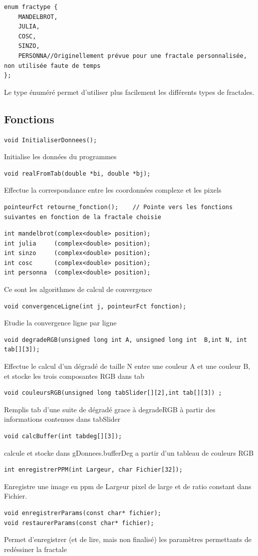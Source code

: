 \documentclass[a4paper,11pt]{article} \usepackage[T1]{fontenc} \usepackage[utf8]{inputenc} \usepackage[francais]{babel}
\begin{document}
\begin{lstlisting}
enum fractype {
    MANDELBROT,
    JULIA,
    COSC,
    SINZO,
    PERSONNA//Originellement prévue pour une fractale personnalisée, non utilisée faute de temps
};\end{lstlisting}
Le type énuméré permet d'utiliser plus facilement les différents types de fractales.


\subsection{Fonctions}
\begin{lstlisting}
void InitialiserDonnees(); \end{lstlisting}
Initialise les données du programmes
\begin{lstlisting}
void realFromTab(double *bi, double *bj);\end{lstlisting}
Effectue la correspondance entre les coordonnées complexe et les pixels
\begin{lstlisting}
pointeurFct retourne_fonction();    // Pointe vers les fonctions suivantes en fonction de la fractale choisie\end{lstlisting}
\begin{lstlisting}
int mandelbrot(complex<double> position);
int julia     (complex<double> position);
int sinzo     (complex<double> position);
int cosc      (complex<double> position);
int personna  (complex<double> position);\end{lstlisting}
Ce sont les algorithmes de calcul de convergence
\begin{lstlisting}
void convergenceLigne(int j, pointeurFct fonction);\end{lstlisting}
Etudie la convergence ligne par ligne
\begin{lstlisting}
void degradeRGB(unsigned long int A, unsigned long int  B,int N, int tab[][3]);\end{lstlisting}
Effectue le calcul d'un dégradé de taille N entre une couleur A et une couleur B, et stocke les trois composantes RGB dans tab
\begin{lstlisting}
void couleursRGB(unsigned long tabSlider[][2],int tab[][3]) ;\end{lstlisting}
Remplis tab d'une suite de dégradé grace à degradeRGB à partir des informations contenues dans tabSlider
\begin{lstlisting}
void calcBuffer(int tabdeg[][3]);\end{lstlisting}
calcule et stocke dans gDonnees.bufferDeg a partir d'un tableau de couleurs RGB
\begin{lstlisting}
int enregistrerPPM(int Largeur, char Fichier[32]);\end{lstlisting}
Enregistre une image en ppm de Largeur pixel de large et de ratio constant dans Fichier.
\begin{lstlisting}
void enregistrerParams(const char* fichier);
void restaurerParams(const char* fichier);\end{lstlisting}
Permet d'enregistrer (et de lire, mais non finalisé) les paramètres permettants de redéssiner la fractale
\end{document}
